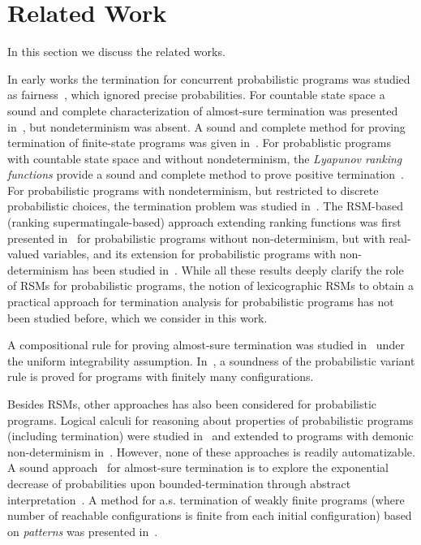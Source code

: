 
\section{Related Work}
In this section we discuss the related works.

\smallskip{}
In early works the termination for concurrent probabilistic programs was studied 
as fairness~\cite{SPH84}, which ignored precise probabilities.
For countable state space a sound and complete characterization of almost-sure termination 
was presented in~\cite{HS85}, but nondeterminism was absent.
A sound and complete method for proving termination of finite-state programs
was given in~\cite{EGK12}.
For probablistic programs with countable state space and without 
nondeterminism, the {\em Lyapunov ranking functions} provide a sound and 
complete method to prove positive termination~\cite{BG05,Foster53}.
For probabilistic programs with nondeterminism, but restricted to discrete probabilistic
choices, the termination problem was studied in~\cite{MM04,MM05}.
The RSM-based (ranking supermatingale-based) approach extending ranking functions was first 
presented in~\cite{SriramCAV} for probabilistic programs without non-determinism,
but with real-valued variables, and its extension for probabilistic programs
with non-determinism has been studied in~\cite{HolgerPOPL,CF17,CFNH16,CFG16,CNZ17}.
While all these results deeply clarify the role of RSMs for probabilistic programs, 
the notion of lexicographic RSMs to obtain a practical approach for termination 
analysis for probabilistic programs has not been studied before, which we consider in 
this work.

\smallskip{} A 
compositional rule for proving almost-sure termination was studied 
in~\cite{HolgerPOPL} under the uniform integrability assumption. 
In~\cite{MM05}, a soundness of the probabilistic variant rule is proved for 
programs with finitely many configurations.


\smallskip{}
Besides RSMs, other approaches has also been considered for probabilistic programs.
Logical calculi for reasoning about properties of 
probabilistic programs (including termination) were studied 
in~\cite{Kozen:prob-semantics,FH:prdl,Kozen:probabilistic-PDL,Feldman:propositional-probdl}
 and extended to programs with demonic non-determinism 
 in~\cite{MM04,MM05,KKMO16:wp-expected-runtime,OKKM16:recursive-prob-wp-calculus,GKI14:prob-semantics,
  DBLP:conf/sas/KatoenMMM10}. However, none of these approaches is readily 
  automatizable.
A sound approach~\cite{DBLP:conf/sas/Monniaux01} for almost-sure termination 
is to explore the exponential decrease of probabilities upon 
bounded-termination 
through abstract interpretation~\cite{DBLP:conf/popl/CousotC77}. A method for 
a.s. termination of weakly finite programs (where number of reachable 
configurations is finite from each initial configuration) based on 
\emph{patterns} was presented in~\cite{EGK12}.
 


